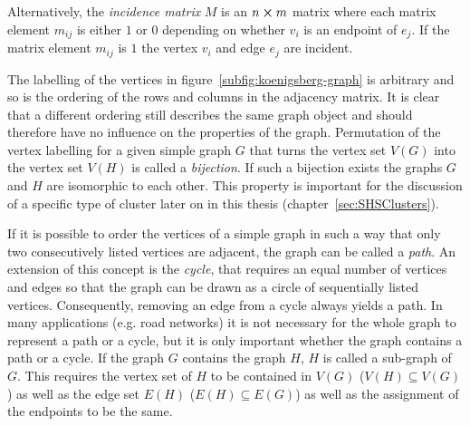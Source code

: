 Alternatively, the \textit{incidence matrix} $M$ is an $n \cross m$ matrix where
each matrix element $m_{ij}$ is either $1$ or $0$ depending on whether $v_i$ is
an endpoint of $e_j$. If the matrix element $m_{ij}$ is $1$ the vertex $v_i$ and
edge $e_j$ are incident.

The labelling of the vertices in figure~\ref{subfig:koenigsberg-graph} is
arbitrary and so is the ordering of the rows and columns in the adjacency
matrix. It is clear that a different ordering still describes the same graph
object and should therefore have no influence on the properties of the graph.
Permutation of the vertex labelling for a given simple graph $G$ that turns the
vertex set $V(G)$ into the vertex set $V(H)$ is called a \textit{bijection}. If
such a bijection exists the graphs $G$ and $H$ are isomorphic to each other.
This property is important for the discussion of a specific type of cluster
later on in this thesis (chapter~\ref{sec:SHSClusters}).

If it is possible to order the vertices of a simple graph in such a way that
only two consecutively listed vertices are adjacent, the graph can be called a
\textit{path}. An extension of this concept is the \textit{cycle}, that requires
an equal number of vertices and edges so that the graph can be drawn as a circle
of sequentially listed vertices. Consequently, removing an edge from a cycle
always yields a path. In many applications (e.g. road networks) it is not
necessary for the whole graph to represent a path or a cycle, but it is only
important whether the graph contains a path or a cycle. If the graph $G$
contains the graph $H$, $H$ is called a sub-graph of $G$. This requires the
vertex set of $H$ to be contained in $V(G)$ ($V(H)\subseteq V(G)$) as well as
the edge set $E(H)$ ($E(H)\subseteq E(G)$) as well as the assignment of the
endpoints to be the same.


